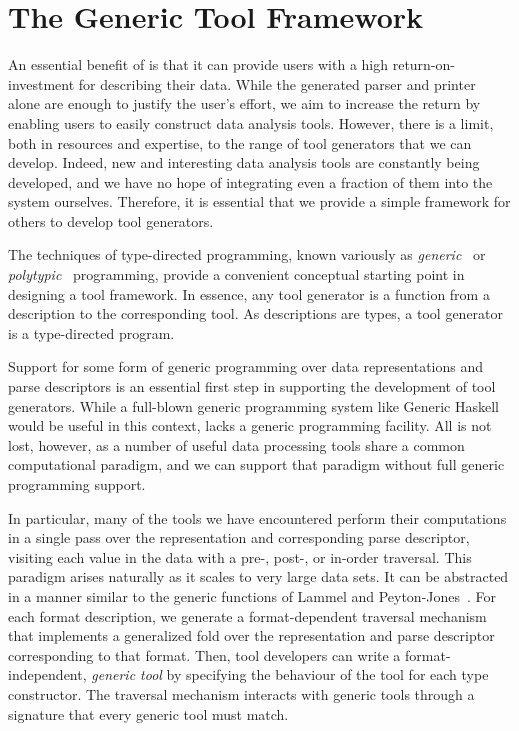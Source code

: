 \section{The Generic Tool Framework}
\label{sec:gen-tool}

An essential benefit of \padsml{} is that it can provide users with a
high return-on-investment for describing their data. While the
generated parser and printer alone are enough to justify the user's
effort, we aim to increase the return by enabling users to easily
construct data analysis tools. However, there is a limit, both in
resources and expertise, to the range of tool generators that we can
develop.  Indeed, new and interesting data analysis tools are
constantly being developed, and we have no hope of integrating even a
fraction of them into the \padsml{} system ourselves. Therefore, it is
essential that we provide a simple framework for others to develop
tool generators.

The techniques of type-directed programming, known variously as
\textit{generic}~\cite{hinze+:generic-programming} or
\textit{polytypic}~\cite{jeuring+:polytypic-programming} programming,
provide a convenient conceptual starting point in designing a tool
framework.  In essence, any tool generator is a function from a description
to the corresponding tool. As \padsml{} descriptions are types, a tool generator is a type-directed program.

Support for some form of generic programming over data representations
and parse descriptors is an essential first step in supporting the
development of tool generators. While a full-blown generic programming
system like Generic Haskell~\cite{hinze+:generic-haskell} would be useful in this context, \ocaml{} lacks a generic programming facility. 
All is not lost, however, as a number of useful data processing tools share a common computational paradigm, and we can support that paradigm without full generic programming support.

In particular, many of the tools we have encountered 
perform their computations in a single pass over the representation
and corresponding parse descriptor, visiting each value in the data
with a pre-, post-, or in-order traversal.  This paradigm arises naturally
as it scales to very large data sets. It can be
abstracted in a manner similar to the generic functions of Lammel and
Peyton-Jones~\cite{lammel+:syb}. For each format description, we generate a
format-dependent traversal mechanism that implements a generalized
fold over the representation and parse descriptor corresponding to
that format. Then, tool developers can write a format-independent,
\emph{generic tool} by specifying the behaviour of the tool for each
\padsml{} type constructor. The traversal mechanism interacts with
generic tools through a signature that every generic tool must match.

